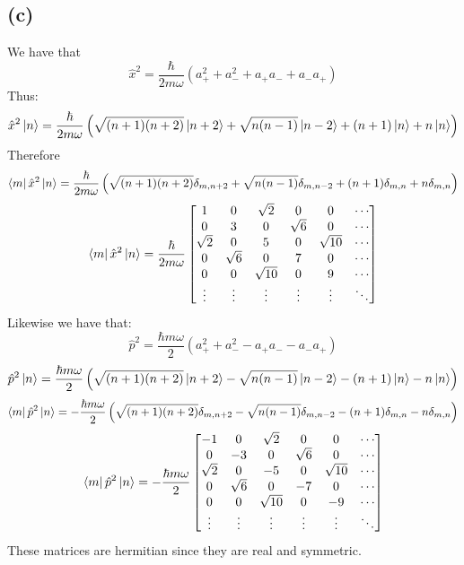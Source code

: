 \documentclass[11pt]{article}
\begin{document}
\subsection*{(c)}
We have that 
$$\hat{x}^2=\frac{\hbar}{2m\omega}\left(
    a_{+}^2+a_{-}^2+a_{+}a_{-}+ a_{-}a_{+}
\right)$$
Thus:
$$\hat{x}^2\ket{n}=
\frac{\hbar}{2m\omega}\left(
    \sqrt{(n+1)(n+2)}\ket{n+2}+\sqrt{n(n-1)}\ket{n-2}
    +(n+1)\ket{n}+n\ket{n}
\right)$$
Therefore 
$$\bra{m}\hat{x}^2\ket{n}=
\frac{\hbar}{2m\omega}\left(
    \sqrt{(n+1)(n+2)}\delta_{m,n+2}+\sqrt{n(n-1)}\delta_{m,n-2}
    +(n+1)\delta_{m,n}+n\delta_{m,n}
\right)$$
$$\bra{m}\hat{x}^2\ket{n}=
\frac{\hbar}{2m\omega}
\begin{bmatrix}
    1 & 0 & \sqrt{2} & 0 & 0 & \cdots \\
    0 & 3 & 0 & \sqrt{6} & 0 & \cdots \\
    \sqrt{2} & 0 & 5 & 0 & \sqrt{10} & \cdots \\
    0 & \sqrt{6} & 0 & 7 & 0 & \cdots \\
    0 & 0 & \sqrt{10} & 0 & 9 & \cdots \\
    \vdots & \vdots & \vdots & \vdots & \vdots & \ddots
\end{bmatrix}
$$
Likewise we have that:
$$\hat{p}^2=
\frac{\hbar m\omega}{2}\left(
    a_{+}^2+a_{-}^2-a_{+}a_{-}- a_{-}a_{+}  
\right)$$
$$\hat{p}^2\ket{n}=
\frac{\hbar m\omega}{2}\left(
    \sqrt{(n+1)(n+2)}\ket{n+2}-\sqrt{n(n-1)}\ket{n-2}
    -(n+1)\ket{n}-n\ket{n}  
\right)$$
$$\bra{m}\hat{p}^2\ket{n}=
-\frac{\hbar m\omega}{2}\left(
    \sqrt{(n+1)(n+2)}\delta_{m,n+2}-\sqrt{n(n-1)}\delta_{m,n-2}
    -(n+1)\delta_{m,n}-n\delta_{m,n}
\right)$$
$$\bra{m}\hat{p}^2\ket{n}=
-\frac{\hbar m\omega}{2}
\begin{bmatrix}
    -1 & 0 & \sqrt{2} & 0 & 0 & \cdots \\
    0 & -3 & 0 & \sqrt{6} & 0 & \cdots \\
    \sqrt{2} & 0 & -5 & 0 & \sqrt{10} & \cdots \\
    0 & \sqrt{6} & 0 & -7 & 0 & \cdots \\
    0 & 0 & \sqrt{10} & 0 & -9 & \cdots \\
    \vdots & \vdots & \vdots & \vdots & \vdots & \ddots
\end{bmatrix}$$
These matrices are hermitian since they are 
real and symmetric.
\end{document}
